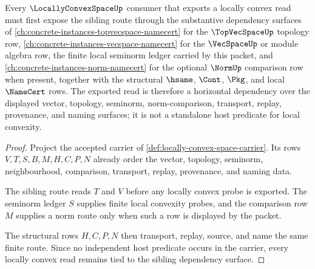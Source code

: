 \begin{theorem}
\label{thm:locally-convex-space-sibling-dependency-route}
Every $\LocallyConvexSpaceUp$ consumer that exports a locally convex read must first expose the sibling route through the substantive dependency surfaces of \autoref{ch:concrete-instances-topvecspace-namecert} for the $\TopVecSpaceUp$ topology row, \autoref{ch:concrete-instances-vecspace-namecert} for the $\VecSpaceUp$ or module algebra row, the finite local seminorm ledger carried by this packet, and \autoref{ch:concrete-instances-norm-namecert} for the optional $\NormUp$ comparison row when present, together with the structural $\hsame$, $\Cont$, $\Pkg$, and local $\NameCert$ rows. The exported read is therefore a horizontal dependency over the displayed vector, topology, seminorm, norm-comparison, transport, replay, provenance, and naming surfaces; it is not a standalone host predicate for local convexity.
\end{theorem}
\begin{proof}
Project the accepted carrier of \autoref{def:locally-convex-space-carrier}. Its rows $V,T,S,B,M,H,C,P,N$ already order the vector, topology, seminorm, neighbourhood, comparison, transport, replay, provenance, and naming data.

The sibling route reads $T$ and $V$ before any locally convex probe is exported. The seminorm ledger $S$ supplies finite local convexity probes, and the comparison row $M$ supplies a norm route only when such a row is displayed by the packet.

The structural rows $H,C,P,N$ then transport, replay, source, and name the same finite route. Since no independent host predicate occurs in the carrier, every locally convex read remains tied to the sibling dependency surface.
\end{proof}


\begin{closurestatus}{\LocallyConvexSpaceUp}
  \theoryclosure{\seedClosure}
  \formalstatus{\unformalizedV}
\end{closurestatus}
